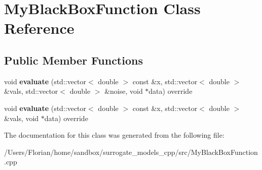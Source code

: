 \hypertarget{class_my_black_box_function}{}\section{My\+Black\+Box\+Function Class Reference}
\label{class_my_black_box_function}
\subsection*{Public Member Functions}
\begin{DoxyCompactItemize}
\item 
void {\bfseries evaluate} (std\+::vector$<$ double $>$ const \&x, std\+::vector$<$ double $>$ \&vals, std\+::vector$<$ double $>$ \&noise, void $\ast$data) override\hypertarget{class_my_black_box_function_a93084f9fcbb6eee928845cb92bd5966b}{}\label{class_my_black_box_function_a93084f9fcbb6eee928845cb92bd5966b}

\item 
void {\bfseries evaluate} (std\+::vector$<$ double $>$ const \&x, std\+::vector$<$ double $>$ \&vals, void $\ast$data) override\hypertarget{class_my_black_box_function_a6e31163b33178a6c52dc7eff861e193e}{}\label{class_my_black_box_function_a6e31163b33178a6c52dc7eff861e193e}

\end{DoxyCompactItemize}


The documentation for this class was generated from the following file\+:\begin{DoxyCompactItemize}
\item 
/\+Users/\+Florian/home/sandbox/surrogate\+\_\+models\+\_\+cpp/src/My\+Black\+Box\+Function.\+cpp\end{DoxyCompactItemize}
